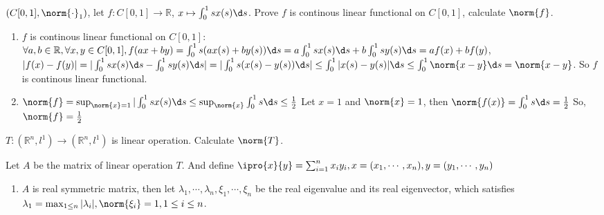 \documentclass{ctexart}
\newif\ifpreface
\begin{document}
\large
\setlength{\baselineskip}{1.2em}
\ifpreface
    
\else
\maketitle
\fi
{}
\begin{problem}
    $(C[0,1],\norm{\cdot}_1)$, let $f:C[0,1]\to \mathbb{R}$, $x\mapsto\int_0^1sx(s)\d s$. 
    Prove $f$ is continous linear functional on $C[0,1]$, calculate $\norm{f}$.
\end{problem}
\begin{solution}
  \begin{enumerate}
    \item \(f\) is continous linear functional on \(C[0,1]\):
      \(\forall a,b \in \mathbb{R}, \forall x,y \in C[0,1], f(ax+by)=\int_{0}^{1} s(ax(s)+by(s)) \d s=a\int_{0}^{1} sx(s)\d s+b\int_{0}^{1}  sy(s)\d s=af(x)+bf(y)\), 
      \(|f(x)-f(y)| = |\int_{0}^{1} sx(s) \d s- \int_{0}^{1} sy(s)\d s|= |\int_{0}^{1} s(x(s)-y(s)) \d s|\leq \int_{0}^{1} |x(s)-y(s)|\d s \leq \int_{0}^{1} \norm{x-y} \d s=\norm{x-y}\). 
      So \(f\) is continous linear functional.
    \item \(\norm{f}=\sup_{\norm{x}=1} |\int_{0}^{1} sx(s)\d s \leq \sup_{\norm{x}} \int_{0}^{1} s \d s \leq \frac{1}{2}\)
      Let \(x=1\) and \(\norm{x}=1\), then \(\norm{f(x)}=\int_{0}^{1} s \d s = \frac{1}{2}\)
      So, \(\norm{f}=\frac{1}{2}\)
  \end{enumerate}
\end{solution}

\begin{problem}
    $T:(\mathbb{R}^n,l^1)\to (\mathbb{R}^n,l^1)$ is linear operation. Calculate $\norm{T}$.
\end{problem}
\begin{solution}
  Let \(A\) be the matrix of linear operation \(T\). And define \(\ipro {x}{y}= \sum_{i=1}^{n} x_i y_i, x=(x_1,\cdots, x_n), y=(y_1,\cdots,y_n) \)
  \begin{enumerate}

    \item \( A\) is real symmetric matrix, then let \(\lambda_1,\cdots,\lambda_n, \xi_1,\cdots,\xi_n\) be 
      the real eigenvalue and its real eigenvector, which satisfies \(\lambda_1=\max_{1 \leq n}|\lambda_i|,\norm{\xi_i}=1, 1 \leq i \leq n\).
      
  \end{enumerate}
\end{solution}
\end{document}
